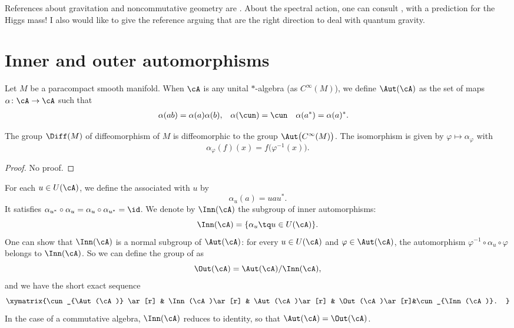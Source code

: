 
References about gravitation and noncommutative geometry are \cite{ConnesMotives,Landi,ConnesNCG,itoNCG_Varilly}. About the spectral action, one can consult \cite{SpectralActPrinciple}, with a prediction for the Higgs mass! I also would like to give the reference \cite{MrTopos} arguing that  are the right direction to deal with quantum gravity.

\section{Inner and outer automorphisms}

Let $M$ be a paracompact smooth manifold. When $\cA$ is any unital $*$-algebra (as $ C^{\infty}(M)$), we define $\Aut(\cA)$ as the set of maps $\alpha\colon \cA\to \cA$ such that
\begin{align}
\alpha(ab)&=\alpha(a)\alpha(b),  
&\alpha(\cun)&=\cun
 & \alpha(a^*)&=\alpha(a)^*.
\end{align}

\begin{proposition}
The group $\Diff(M)$ of diffeomorphism of $M$ is diffeomorphic to the group $\Aut\big(  C^{\infty}(M) \big)$. The isomorphism is given by $\varphi\mapsto\alpha_{\varphi}$ with
\[ 
  \alpha_{\varphi}(f)(x)=f\big( \varphi^{-1}(x) \big).
\]
\end{proposition}
\begin{proof}
No proof.
\end{proof}

For each $u\in U(\cA)$, we define the  associated with $u$ by
\begin{equation}
\alpha_u(a)=uau^*.
\end{equation}
It satisfies $\alpha_{u^*}\circ\alpha_{u}=\alpha_u\circ\alpha_{u^*}=\id$. We denote by $\Inn(\cA)$ the subgroup of inner automorphisms:
\[ 
  \Inn(\cA)=\{ \alpha_u\tq u\in U(\cA) \}.
\]
One can show that $\Inn(\cA)$ is a normal subgroup of $\Aut(\cA)$: for every $u\in U(\cA)$ and $\varphi\in\Aut(\cA)$, the automorphism $\varphi^{-1}\circ\alpha_u\circ\varphi$ belongs to $\Inn(\cA)$. So we can define the group of  as
\[ 
  \Out(\cA)=\Aut(\cA)/\Inn(\cA),
\]
and we have the short exact sequence
\begin{equation}
\xymatrix{%
   \cun_{\Aut(\cA)} \ar[r]	&	\Inn(\cA)\ar[r]	&	\Aut(\cA)\ar[r]	&	\Out(\cA)\ar[r]&\cun_{\Inn(\cA)}.
}
\end{equation}
In the case of a commutative algebra, $\Inn(\cA)$ reduces to identity, so that $\Aut(\cA)=\Out(\cA)$. 



